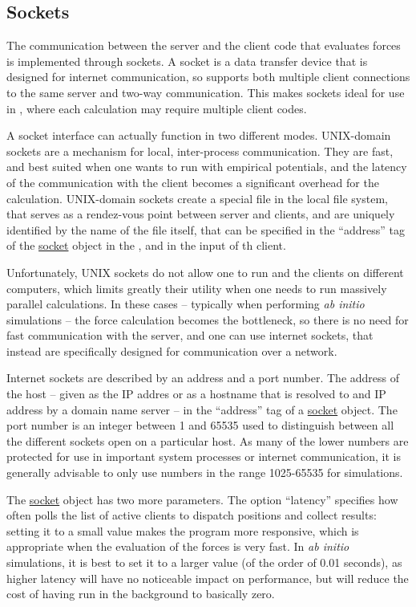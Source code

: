 \documentclass[11pt,english,fleqn]{report}
\begin{document}
\subsection{Sockets} \label{sockets}

The communication between the \ipi server and the client code that
evaluates forces is implemented through sockets. A socket is a 
data transfer device that is designed for internet communication,
so supports both multiple client connections to the same server and
two-way communication. This makes sockets ideal for use in \ipi,
where each calculation may require multiple client codes. 

A socket interface can actually function in two different modes.
UNIX-domain sockets are a mechanism for local, inter-process
communication. They are fast, and best suited when one wants
to run \ipi  with empirical potentials, and the latency of the 
communication with the client becomes a significant overhead
for the calculation. UNIX-domain sockets create a special file
in the local file system, that serves as a rendez-vous point
between server and clients, and are uniquely identified by the
name of the file itself, that can be specified in the ``address'' tag of 
the \hyperref[SOCKET]{socket} object in the \ipi, and in 
the input of th client.

Unfortunately, UNIX sockets do not allow one to run \ipi{} and 
the clients on different computers, which limits greatly their 
utility when  one needs to run massively parallel calculations. 
In these cases -- typically when performing \emph{ab initio} 
simulations -- the force calculation becomes the bottleneck, so there is no
need for fast communication with the server, and one can 
use internet sockets, that instead are specifically designed
for communication over a network.

Internet sockets are described by an address and a port number.
The address of the host -- given as the IP addres
or as a hostname that is resolved to and IP address by a domain name server --
in the {}``address'' tag of a \hyperref[SOCKET]{socket} object. 
The port number is an integer between 1 and 65535 used to distinguish
between all the different sockets open on a particular host. As
many of the lower numbers are protected for use in important system
processes or internet communication, it is generally advisable to
only use numbers in the range 1025-65535 for simulations.

The \hyperref[SOCKET]{socket} object has two more parameters.
The option ``latency'' specifies how often \ipi{} polls the list of 
active clients to dispatch positions and collect results:
setting it to a small value makes the program more responsive, 
which is appropriate when the evaluation of the forces is very
fast. In \emph{ab initio} simulations, it is best to set it to 
a larger value (of the order of 0.01 seconds), as higher latency 
will have no noticeable impact on performance, but will reduce 
the cost of having \ipi run in the background to basically zero. 
\end{document}
